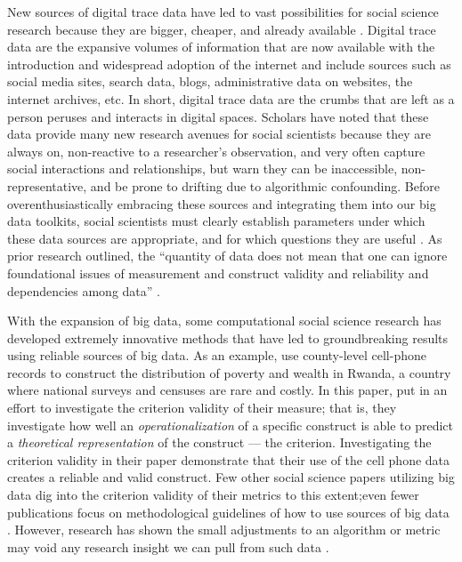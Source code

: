 New sources of digital trace data have led to vast possibilities for social
science research because they are bigger, cheaper, and already available
\citep{kingEnsuringDataRichFuture2011,lazerComputationalSocialScience2009,salganikBitBitSocial2017}.
Digital trace data are the expansive volumes of information that are now
available with the introduction and widespread adoption of the internet and
include sources such as social media sites, search data, blogs, administrative
data on websites, the internet archives, etc. In short, digital trace data are
the crumbs that are left as a person peruses and interacts in digital spaces.
Scholars have noted that these data provide many new research avenues for social
scientists because they are always on, non-reactive to a researcher's
observation, and very often capture social interactions and relationships, but
warn they can be inaccessible, non-representative, and be prone to drifting due
to algorithmic confounding\citep{salganikBitBitSocial2017}. Before
overenthusiastically embracing these sources and integrating them into our big
data toolkits, social scientists must clearly establish parameters under which
these data sources are appropriate, and for which questions they are useful
\citep{bailCulturalEnvironmentMeasuring2014, lazerParableGoogleFlu2014}. As
prior research outlined, the ``quantity of data does not mean that one can ignore
foundational issues of measurement and construct validity and reliability and
dependencies among data'' \citep[p. 1203]{lazerParableGoogleFlu2014}.

With the expansion of big data, some computational social science research has
developed extremely innovative methods that have led to groundbreaking results
using reliable sources of big data. As an
example,\citet{blumenstockPredictingPovertyWealth2015} use county-level
cell-phone records to construct the distribution of poverty and wealth in
Rwanda, a country where national surveys and censuses are rare and costly.
In this paper,  \citet{blumenstockPredictingPovertyWealth2015} put in an effort to 
investigate the criterion validity of their measure; that is, they investigate 
how well an \textit{operationalization} of a specific construct is able to 
predict a \textit{theoretical representation} of the construct — the criterion. 
Investigating the criterion validity in their paper demonstrate that their use
of the cell phone data creates a reliable and valid construct. 
Few other social science papers utilizing big data dig into the criterion
validity of their metrics to this extent;even fewer publications focus on
methodological guidelines of how to use sources of big data \citep[For
exceptions, see ][]{asseoTrackingCOVID19Using2020,
stilesAssessingCriterionValidity2018}. However, research has shown the small
adjustments to an algorithm or metric may void any research insight we can pull
from such data \citep{lazerParableGoogleFlu2014}.


